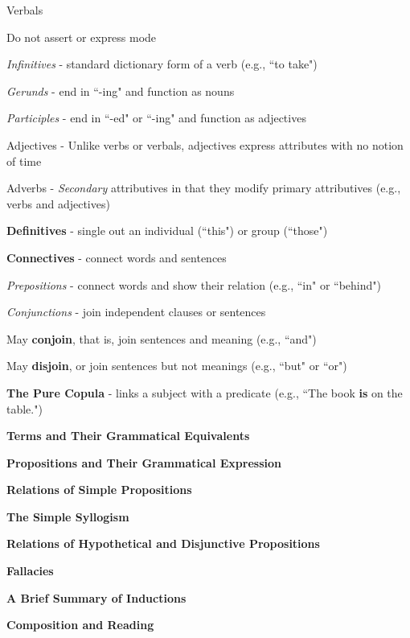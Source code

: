 \documentclass{report}
\begin{document}
\begin{outline}
\begin{outline}
\begin{outline}
\begin{outline}
\begin{outline}
            \end{outline}
           \end{outline}
        \item Verbals
          \begin{outline}
            \item Do not assert or express mode
            \item \textit{Infinitives} - standard dictionary form of a verb (e.g., ``to take")
            \item \textit{Gerunds} -  end in ``-ing" and function as nouns
            \item \textit{Participles} - end in ``-ed" or ``-ing" and function as adjectives
          \end{outline}
        \item Adjectives - Unlike verbs or verbals, adjectives express attributes with no notion of time
        \item Adverbs - \textit{Secondary} attributives in that they modify primary attributives (e.g., verbs and adjectives)
        \end{outline}   
        \newpage
    \item {\bf Definitives} - single out an individual (``this") or group (``those")
    \item {\bf Connectives} - connect words and sentences
      \begin{outline}
        \item \textit{Prepositions} - connect words and show their relation (e.g., ``in" or ``behind")
        \item \textit{Conjunctions} - join independent clauses or sentences
          \begin{outline}
            \item May {\bf conjoin}, that is, join sentences and meaning (e.g., ``and")
            \item May {\bf disjoin}, or join sentences but not meanings (e.g., ``but" or ``or")
          \end{outline}
        \end{outline}
    \item {\bf The Pure Copula} - links a subject with a predicate (e.g., ``The book {\bf is} on the table.")
  \end{outline}
  \item {\bf Terms and Their Grammatical Equivalents}
  \item {\bf Propositions and Their Grammatical Expression}
  \item {\bf Relations of Simple Propositions}
  \item {\bf The Simple Syllogism}
  \item {\bf Relations of Hypothetical and Disjunctive Propositions}
  \item {\bf Fallacies}
  \item {\bf A Brief Summary of Inductions}
  \item {\bf Composition and Reading}
\end{outline}
\end{document}
